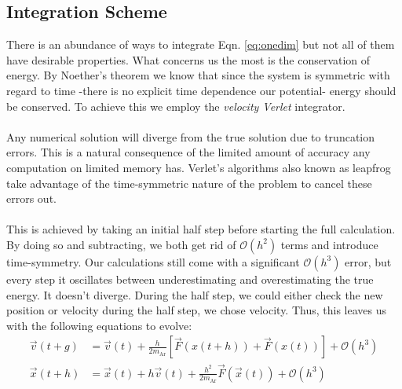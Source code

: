 \documentclass{IAYCPro}
\begin{document}
\subsection{Integration Scheme}
There is an abundance of ways to integrate Eqn. \ref{eq:onedim} but not all of them have desirable properties. What concerns us the most is the conservation of energy. By Noether's theorem we know that since the system is symmetric with regard to time -there is no explicit time dependence our potential- energy should be conserved. To achieve this we employ the \textit{velocity Verlet} integrator. \\ \\
Any numerical solution will diverge from the true solution due to truncation errors. This is a natural consequence of the limited amount of accuracy any computation on limited memory has. Verlet's algorithms also known as leapfrog take advantage of the time-symmetric nature of the problem to cancel these errors out. \\ \\
This is achieved by taking an initial half step before starting the full calculation. By doing so and subtracting, we both get rid of $\mathcal{O}(h^2)$ terms and introduce time-symmetry. Our calculations still come with a significant $\mathcal{O}(h^3)$ error, but every step it oscillates between underestimating and overestimating the true energy. It doesn't diverge. During the half step, we could either check the new position or velocity during the half step, we chose velocity. Thus, this leaves us with the following equations to evolve:
\begin{align}
    \vec{v}\left(t+g\right) &= \vec{v}(t) + \frac{h}{2m_\mathrm{Ar}}\left[\vec{F}\left(x(t+h)\right) + \vec{F}\left(x(t)\right) \right] + \mathcal{O}(h^3)
    \label{eqn: Verlet Vel}
    \\
    \Vec{x}\left(t + h\right) &= \vec{x}\left(t \right) +  h\vec{v}\left(t \right) + \frac{h^2}{2m_\text{Ar}} \vec{F}(\vec{x}(t)) + \mathcal{O}(h^3)
    \label{eqn: Verlet Pos}
\end{align}

\raggedbottom
\newpage
\end{document}
